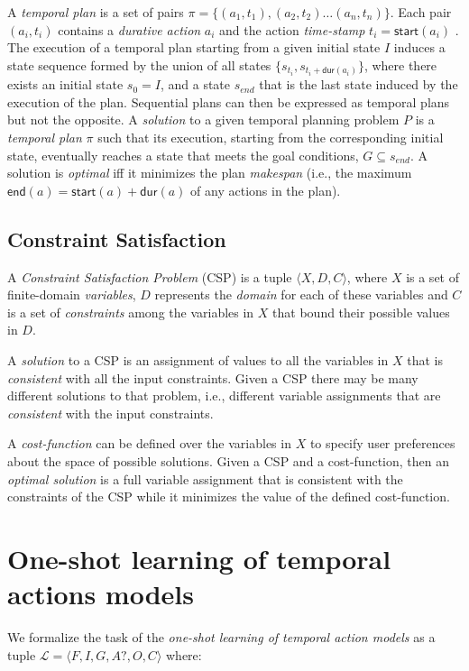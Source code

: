 \documentclass{ecai}
\newcommand{\tup}[1]{{\langle #1 \rangle}}
\newcommand{\dur}{\mathsf{dur}}    %
\newcommand{\start}{\mathsf{start}}%
\newcommand{\en}{\mathsf{end}}     %
\begin{document}
A {\em temporal plan} is a set of pairs $\pi=\{(a_1,t_1),(a_2,t_2)\ldots (a_n,t_n)\}$. Each pair $(a_i,t_i)$ contains a {\em durative action} $a_i$ and the action {\em time-stamp} $t_i=\start(a_i)$ . The execution of a temporal plan starting from a given initial state $I$ induces a state sequence formed by the union of all states $\{s_{t_i}, s_{t_i+\dur(a_i)}\}$, where there exists an initial state $s_{0}=I$, and a state $s_{end}$ that is the last state induced by the execution of the plan. Sequential plans can then be expressed as temporal plans but not the opposite. A {\em solution} to a given temporal planning problem $P$ is a {\em temporal plan} $\pi$ such that its execution, starting from the corresponding initial state, eventually reaches a state that meets the goal conditions, $G\subseteq s_{end}$. A solution is {\em optimal} iff it minimizes the plan {\em makespan} (i.e., the maximum $\en(a)=\start(a)+\dur(a)$ of any actions in the plan).

\subsection{Constraint Satisfaction}
A {\em Constraint Satisfaction Problem} (CSP) is a tuple $\tup{X,D,C}$, where $X$ is a set of finite-domain {\em variables}, $D$ represents the {\em domain} for each of these variables and $C$ is a set of {\em constraints} among the variables in $X$ that bound their possible values in $D$.

A {\em solution} to a CSP is an assignment of values to all the variables in $X$ that is {\em consistent} with all the input constraints. Given a CSP there may be many different solutions to that problem, i.e., different variable assignments that are {\em consistent} with the input constraints.

A {\em cost-function} can be defined over the variables in $X$ to specify user preferences about the space of possible solutions. Given a CSP and a cost-function, then an {\em optimal solution} is a full variable assignment that is consistent with the constraints of the CSP while it minimizes the value of the defined cost-function.



\section{One-shot learning of temporal actions models}
\label{section:learningTemporalModels}
We formalize the task of the {\em one-shot learning of temporal action models} as a tuple $\mathcal{L}=\tup{F,I,G,A?,O,C}$ where:
\end{document}
